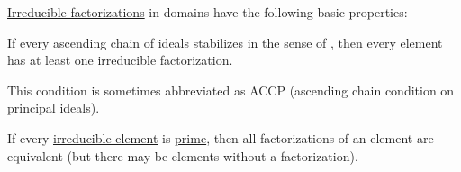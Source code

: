 \begin{proposition}\label{thm:def:irreducible_factorization/properties}
  \hyperref[def:irreducible_factorization]{Irreducible factorizations} in domains have the following basic properties:
  \begin{thmenum}
     If every ascending chain of  ideals stabilizes in the sense of , then every element has at least one irreducible factorization.

    This condition is sometimes abbreviated as ACCP (ascending chain condition on principal ideals).

     If every \hyperref[def:domain_divisibility/irreducible]{irreducible element} is \hyperref[def:domain_divisibility/prime]{prime}, then all factorizations of an element are equivalent (but there may be elements without a factorization).
  \end{thmenum}
\end{proposition}
